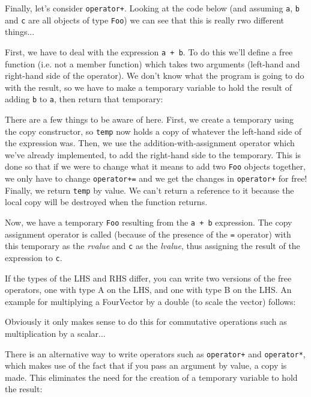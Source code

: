 \documentclass[a4paper]{scrartcl}
\begin{document}
Finally, let's consider \verb|operator+|. Looking at the code below (and assuming \verb|a|, \verb|b| and \verb|c| are all objects of type \verb|Foo|) we can see that this is really rwo different things...



First, we have to deal with the expression \verb|a + b|. To do this we'll define a free function (i.e. not a member function) which takes two arguments (left-hand and right-hand side of the operator). We don't know what the program is going to do with the result, so we have to make a temporary variable to hold the result of adding \verb|b| to \verb|a|, then return that temporary:



There are a few things to be aware of here. First, we create a temporary using the copy constructor, so \verb|temp| now holds a copy of whatever the left-hand side of the expression was. Then, we use the addition-with-assignment operator which we've already implemented, to add the right-hand side to the temporary. This is done so that if we were to change what it means to add two \verb|Foo| objects together, we only have to change \verb|operator+=| and we get the changes in \verb|operator+| for free! Finally, we return \verb|temp| by value. We can't return a reference to it because the local copy will be destroyed when the function returns.

Now, we have a temporary \verb|Foo| resulting from the \verb|a + b| expression. The copy assignment operator is called (because of the presence of the \verb|=| operator) with this temporary as the \emph{rvalue} and \verb|c| as the \emph{lvalue}, thus assigning the result of the expression to \verb|c|.

If the types of the LHS and RHS differ, you can write two versions of the free operators, one with type A on the LHS, and one with type B on the LHS. An example for multiplying a FourVector by a double (to scale the vector) follows:



Obviously it only makes sense to do this for commutative operations such as multiplication by a scalar...

There is an alternative way to write operators such as \verb|operator+| and \verb|operator*|, which makes use of the fact that if you pass an argument by value, a copy is made. This eliminates the need for the creation of a temporary variable to hold the result:
\end{document}
